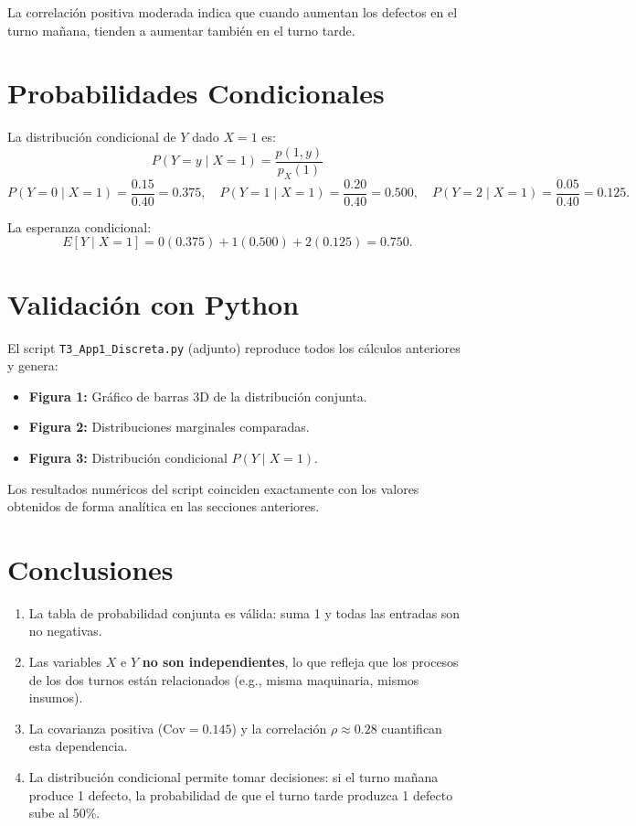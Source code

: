 \documentclass[12pt,a4paper]{article}
\begin{document}
La correlación positiva moderada indica que cuando aumentan los defectos en
el turno mañana, tienden a aumentar también en el turno tarde.
 
\section{Probabilidades Condicionales}
 
La distribución condicional de $Y$ dado $X=1$ es:
\[
  P(Y=y \mid X=1) = \frac{p(1,y)}{p_X(1)}
\]
\[
  P(Y=0\mid X=1)=\frac{0.15}{0.40}=0.375, \quad
  P(Y=1\mid X=1)=\frac{0.20}{0.40}=0.500, \quad
  P(Y=2\mid X=1)=\frac{0.05}{0.40}=0.125.
\]
 
La esperanza condicional:
\[
  E[Y\mid X=1] = 0(0.375)+1(0.500)+2(0.125) = 0.750.
\]
 
\section{Validación con Python}
 
El script \texttt{T3\_App1\_Discreta.py} (adjunto) reproduce todos los
cálculos anteriores y genera:
 
\begin{itemize}
  \item \textbf{Figura 1:} Gráfico de barras 3D de la distribución conjunta.
  \item \textbf{Figura 2:} Distribuciones marginales comparadas.
  \item \textbf{Figura 3:} Distribución condicional $P(Y\mid X=1)$.
\end{itemize}
 
Los resultados numéricos del script coinciden exactamente con los valores
obtenidos de forma analítica en las secciones anteriores.
 
\section{Conclusiones}
 
\begin{enumerate}
  \item La tabla de probabilidad conjunta es válida: suma 1 y todas las
        entradas son no negativas.
  \item Las variables $X$ e $Y$ \textbf{no son independientes}, lo que
        refleja que los procesos de los dos turnos están relacionados
        (e.g., misma maquinaria, mismos insumos).
  \item La covarianza positiva ($\text{Cov}=0.145$) y la correlación
        $\rho\approx 0.28$ cuantifican esta dependencia.
  \item La distribución condicional permite tomar decisiones: si el turno
        mañana produce 1 defecto, la probabilidad de que el turno tarde
        produzca 1 defecto sube al 50\%.
\end{enumerate}
 
\end{document}
